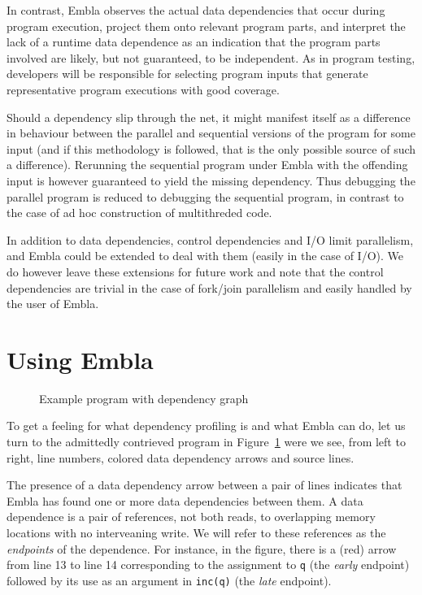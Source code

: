 \documentclass{acm_proc_article-sp}
\begin{document}
In contrast, Embla
observes the actual data dependencies that occur during program
execution, project them onto relevant program parts, and interpret the
lack of a runtime data dependence as an indication that the program
parts involved are likely, but not guaranteed, to be independent.
As in program testing, developers will be responsible for selecting
program inputs that generate representative program executions with
good coverage.

Should a dependency slip through the net, it might manifest itself as a 
difference in behaviour between the parallel and sequential versions of the
program for some input (and if this methodology is followed, that is the only 
possible source of such a difference). Rerunning the sequential program under
Embla with the offending input is however guaranteed to yield the missing 
dependency.
Thus debugging the parallel program is reduced to debugging the sequential 
program, in contrast to the case of ad hoc construction of multithreded
code.

In addition to data dependencies, control dependencies and I/O limit parallelism,
and Embla could be extended to deal with them (easily in the case of I/O). We
do however leave these extensions for future work and note that the control
dependencies are trivial in the case of fork/join parallelism and easily handled 
by the user of Embla.



\section{Using Embla}

\begin{figure} 
\small

\caption{Example program with dependency graph} \label{ffirstex}
\end{figure}

To get a feeling for what dependency profiling is and what Embla can do, 
let us turn to the admittedly contrieved program in Figure~\ref{ffirstex}
were we see, from left to right, line numbers, colored data dependency 
arrows and source lines. 

The presence of a data dependency arrow between a pair of lines indicates
that Embla has found one or more data dependencies between them. 
A data dependence is a pair
of references, not both reads, to overlapping memory
locations with no interveaning write. We will refer to these
references as the {\em endpoints} of the dependence.
For instance, in the figure, 
there is a (red) arrow from line 13 to line 14 corresponding to
the assignment to {\tt q} (the {\em early} endpoint) followed by its use 
as an argument in {\tt inc(q)} (the {\em late} endpoint).
\end{document}
